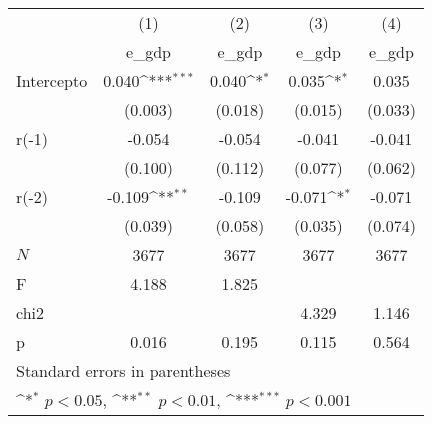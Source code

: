 {
\def\sym#1{\ifmmode^{#1}\else\(^{#1}\)\fi}
\begin{longtable}{l*{4}{c}}
\hline\hline\endfirsthead\hline\endhead\hline\endfoot\endlastfoot
            &\multicolumn{1}{c}{(1)}&\multicolumn{1}{c}{(2)}&\multicolumn{1}{c}{(3)}&\multicolumn{1}{c}{(4)}\\
            &\multicolumn{1}{c}{e\_gdp}&\multicolumn{1}{c}{e\_gdp}&\multicolumn{1}{c}{e\_gdp}&\multicolumn{1}{c}{e\_gdp}\\
\hline
Intercepto  &       0.040\sym{***}&       0.040\sym{*}  &       0.035\sym{*}  &       0.035         \\
            &     (0.003)         &     (0.018)         &     (0.015)         &     (0.033)         \\
r(-1)       &      -0.054         &      -0.054         &      -0.041         &      -0.041         \\
            &     (0.100)         &     (0.112)         &     (0.077)         &     (0.062)         \\
r(-2)       &      -0.109\sym{**} &      -0.109         &      -0.071\sym{*}  &      -0.071         \\
            &     (0.039)         &     (0.058)         &     (0.035)         &     (0.074)         \\
\hline
\(N\)       &        3677         &        3677         &        3677         &        3677         \\
F           &       4.188         &       1.825         &                     &                     \\
chi2        &                     &                     &       4.329         &       1.146         \\
p           &       0.016         &       0.195         &       0.115         &       0.564         \\
\hline\hline
\multicolumn{5}{l}{\footnotesize Standard errors in parentheses}\\
\multicolumn{5}{l}{\footnotesize \sym{*} \(p<0.05\), \sym{**} \(p<0.01\), \sym{***} \(p<0.001\)}\\
\end{longtable}
}
